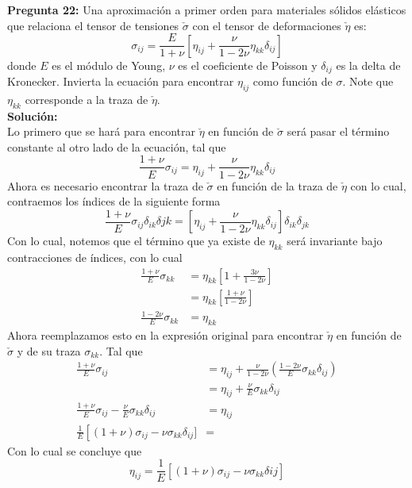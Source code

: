 \documentclass[11pt,letterpaper]{article}
\begin{document}
\textbf{Pregunta 22:} Una aproximación a primer orden para materiales sólidos elásticos que relaciona el tensor de tensiones $\check{\sigma}$ con el tensor de deformaciones $\check{\eta}$ es:
\begin{equation}
  \sigma_{ij}= \frac{E}{1+\nu} \left[\eta_{ij} + \frac{\nu}{1-2\nu}\eta_{kk}\delta_{ij}\right]
\end{equation}
donde $E$ es el módulo de Young, $\nu$ es el coeficiente de Poisson y $\delta_{ij}$ es la delta de Kronecker. Invierta la ecuación para encontrar $\eta_{ij}$ como función de $\sigma$. Note que $\eta_{kk}$ corresponde a la traza de $\check{\eta}$.\\
\textbf{Solución:} \\
Lo primero que se hará para encontrar $\check{\eta}$ en función de $\check{\sigma}$ será pasar el término constante al otro lado de la ecuación, tal que
\begin{equation*}
  \frac{1+\nu}{E}\sigma_{ij} = \eta_{ij} + \frac{\nu}{1-2\nu}\eta_{kk}\delta_{ij}
\end{equation*}
Ahora es necesario encontrar la traza de $\check{\sigma}$ en función de la traza de $\check{\eta}$ con lo cual, contraemos los índices de la siguiente forma
\begin{equation*}
  \frac{1+\nu}{E}\sigma_{ij}\delta_{ik}\delta{jk} = \left[\eta_{ij} +\frac{\nu}{1-2\nu}\eta_{kk}\delta_{ij}\right]\delta_{ik}\delta_{jk}
\end{equation*}
Con lo cual, notemos que el término que ya existe de $\eta_{kk}$ será invariante bajo contracciones de índices, con lo cual
\begin{align*}
  \frac{1+\nu}{E}\sigma_{kk}  & = \eta_{kk}\left[1+\frac{3\nu}{1-2\nu}\right] \\
  & = \eta_{kk}\left[ \frac{1+\nu}{1-2\nu} \right] \\
  \frac{1-2\nu}{E}\sigma_{kk} & = \eta_{kk}
\end{align*}
Ahora reemplazamos esto en la expresión original para encontrar $\check{\eta}$ en función de $\check{\sigma}$ y de su traza $\sigma_{kk}$. Tal que
\begin{align*}
  \frac{1+\nu}{E}\sigma_{ij} & =  \eta_{ij} + \frac{\nu}{1-2\nu}\left(\frac{1-2\nu}{E}\sigma_{kk}\delta_{ij}\right) \\
  & = \eta_{ij} + \frac{\nu}{E}\sigma_{kk}\delta_{ij} \\
  \frac{1+\nu}{E}\sigma_{ij} -\frac{\nu}{E} \sigma_{kk}\delta_{ij} & = \eta_{ij} \\
  \frac{1}{E}\left[(1+\nu)\sigma_{ij}-\nu\sigma_{kk}\delta_{ij}] & = 
\end{align*}
Con lo cual se concluye que
\begin{equation}
  \eta_{ij}=\frac{1}{E}\left[(1+\nu)\sigma_{ij}-\nu\sigma_{kk}\delta{ij}\right]
\end{equation}
\end{document}
